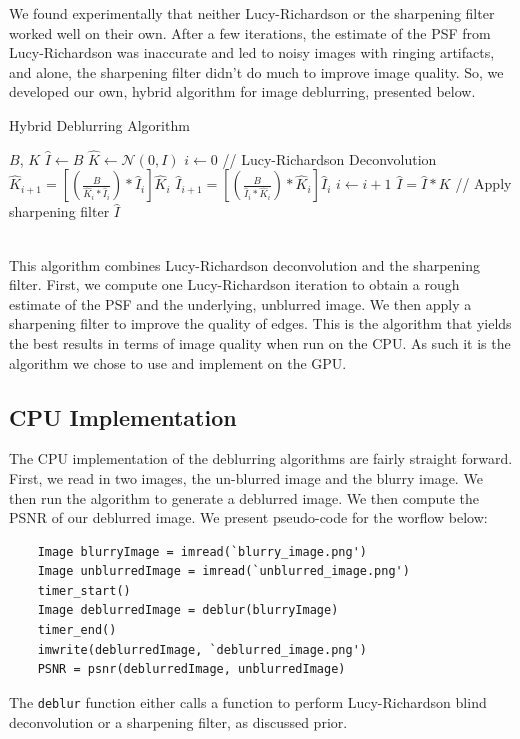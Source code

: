 \documentclass{article}
\begin{document}
We found experimentally that neither Lucy-Richardson or the sharpening filter worked well on their own. After a few iterations, the estimate of the PSF from Lucy-Richardson was inaccurate and led to noisy images with ringing artifacts, and alone, the sharpening filter didn't do much to improve image quality. So, we developed our own, hybrid algorithm for image deblurring, presented below. 
\begin{algorithm}
\caption{Hybrid Deblurring Algorithm}
\begin{algorithmic} 
\REQUIRE $B$, $K$
    \STATE $\hat{I} \leftarrow B$
    \STATE $\hat{K} \leftarrow  \mathcal{N}(0, I)$
    \STATE $i \leftarrow 0$
          \STATE // Lucy-Richardson Deconvolution 
          \STATE $\hat{K} _{i+1} = \left[ \left(\frac{B}{\hat{K}_i * \hat{I}_i}      \right) * \hat{I}_i \right]\hat{K}_i $  
           \STATE $\hat{I} _{i+1} = \left[ \left(\frac{B}{\hat{I}_i * \hat{K}_i}      \right) * \hat{K}_i \right]\hat{I}_i $ 
        \STATE $i \leftarrow i + 1$
    \ENDWHILE
    \STATE $\hat{I} = \hat{I}* K$ // Apply sharpening filter
    \RETURN $\hat{I}$
\end{algorithmic}
\end{algorithm}\\
This algorithm combines Lucy-Richardson deconvolution and the sharpening filter. First, we compute one Lucy-Richardson iteration to obtain a rough estimate of the PSF and the underlying, unblurred image. We then apply a sharpening filter to improve the quality of edges. This is the algorithm that yields the best results in terms of image quality when run on the CPU. As such it is the algorithm we chose to use and implement on the GPU. 


\subsection{CPU Implementation}
The CPU implementation of the deblurring algorithms are fairly straight forward. First, we read in two images, the un-blurred image and the blurry image. We then run the algorithm to generate a deblurred image. We then compute the PSNR of our deblurred image. We present pseudo-code for the worflow below:
\begin{verbatim}
    Image blurryImage = imread(`blurry_image.png')
    Image unblurredImage = imread(`unblurred_image.png')
    timer_start()
    Image deblurredImage = deblur(blurryImage)
    timer_end()
    imwrite(deblurredImage, `deblurred_image.png')
    PSNR = psnr(deblurredImage, unblurredImage)
\end{verbatim}{}
The \texttt{deblur} function either calls a function to perform Lucy-Richardson blind deconvolution or a sharpening filter, as discussed prior. 
\end{document}
